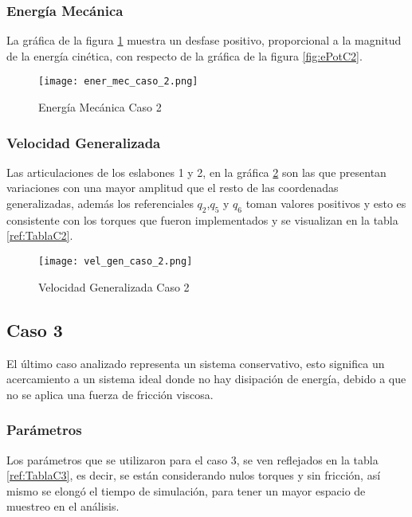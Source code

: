     \subsubsection{Energía Mecánica}
    La gráfica de la figura \ref{fig:eMecC2} muestra un desfase positivo, proporcional a la magnitud de la energía cinética, con respecto de la gráfica de la figura \ref{fig:ePotC2}.
    \begin{figure} [H]%
            \centering
            \texttt{[image: ener\_mec\_caso\_2.png]} 
        \caption{Energía Mecánica Caso 2}
        \label{fig:eMecC2}
    \end{figure}

    \subsubsection{Velocidad Generalizada}
    Las articulaciones de los eslabones 1 y 2, en la gráfica \ref{fig:VelGenC2} son las que presentan variaciones con una mayor amplitud que el resto de las coordenadas generalizadas, además los referenciales $q_2$,$q_5$ y $q_6$ toman valores positivos y esto es consistente con los torques que fueron implementados y se visualizan en la tabla \ref{ref:TablaC2}.
    \begin{figure}[H]%
            \centering
            \texttt{[image: vel\_gen\_caso\_2.png]} 
        \caption{Velocidad Generalizada Caso 2}
        \label{fig:VelGenC2}
    \end{figure}

\subsection{Caso 3}
    El último caso analizado representa un sistema conservativo, esto significa un acercamiento a un sistema ideal donde no hay disipación de energía, debido a que no se aplica una fuerza de fricción viscosa.

    \subsubsection{Parámetros}

    Los parámetros que se utilizaron para el caso 3, se ven reflejados en la tabla \ref{ref:TablaC3}, es decir, se están considerando nulos torques y sin fricción, así mismo se elongó el tiempo de simulación, para tener un mayor espacio de muestreo en el análisis.

